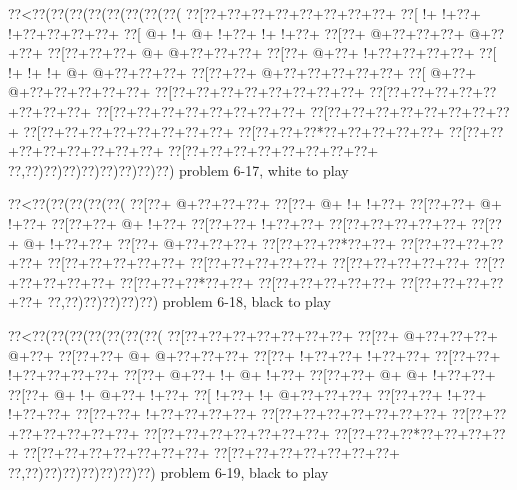 \vbox{\vbox{\goo
\0??<\0??(\0??(\0??(\0??(\0??(\0??(\0??(\0??(
\0??[\0??+\0??+\0??+\0??+\0??+\0??+\0??+\0??+
\0??[\- !+\- !+\0??+\- !+\0??+\0??+\0??+\0??+
\0??[\- @+\- !+\- @+\- !+\0??+\- !+\- !+\0??+
\0??[\0??+\- @+\0??+\0??+\0??+\- @+\0??+\0??+
\0??[\0??+\0??+\0??+\- @+\- @+\0??+\0??+\0??+
\0??[\0??+\- @+\0??+\- !+\0??+\0??+\0??+\0??+
\0??[\- !+\- !+\- !+\- @+\- @+\0??+\0??+\0??+
\0??[\0??+\0??+\- @+\0??+\0??+\0??+\0??+\0??+
\0??[\- @+\0??+\- @+\0??+\0??+\0??+\0??+\0??+
\0??[\0??+\0??+\0??+\0??+\0??+\0??+\0??+\0??+
\0??[\0??+\0??+\0??+\0??+\0??+\0??+\0??+\0??+
\0??[\0??+\0??+\0??+\0??+\0??+\0??+\0??+\0??+
\0??[\0??+\0??+\0??+\0??+\0??+\0??+\0??+\0??+
\0??[\0??+\0??+\0??+\0??+\0??+\0??+\0??+\0??+
\0??[\0??+\0??+\0??*\0??+\0??+\0??+\0??+\0??+
\0??[\0??+\0??+\0??+\0??+\0??+\0??+\0??+\0??+
\0??[\0??+\0??+\0??+\0??+\0??+\0??+\0??+\0??+
\0??,\0??)\0??)\0??)\0??)\0??)\0??)\0??)\0??)
}
\hfil problem 6-17, white to play\hfil\break
}

\vbox{\vbox{\goo
\0??<\0??(\0??(\0??(\0??(\0??(
\0??[\0??+\- @+\0??+\0??+\0??+
\0??[\0??+\- @+\- !+\- !+\0??+
\0??[\0??+\0??+\- @+\- !+\0??+
\0??[\0??+\0??+\- @+\- !+\0??+
\0??[\0??+\0??+\- !+\0??+\0??+
\0??[\0??+\0??+\0??+\0??+\0??+
\0??[\0??+\- @+\- !+\0??+\0??+
\0??[\0??+\- @+\0??+\0??+\0??+
\0??[\0??+\0??+\0??*\0??+\0??+
\0??[\0??+\0??+\0??+\0??+\0??+
\0??[\0??+\0??+\0??+\0??+\0??+
\0??[\0??+\0??+\0??+\0??+\0??+
\0??[\0??+\0??+\0??+\0??+\0??+
\0??[\0??+\0??+\0??+\0??+\0??+
\0??[\0??+\0??+\0??*\0??+\0??+
\0??[\0??+\0??+\0??+\0??+\0??+
\0??[\0??+\0??+\0??+\0??+\0??+
\0??,\0??)\0??)\0??)\0??)\0??)
}
\hfil problem 6-18, black to play\hfil\break
}

\vbox{\vbox{\goo
\0??<\0??(\0??(\0??(\0??(\0??(\0??(\0??(
\0??[\0??+\0??+\0??+\0??+\0??+\0??+\0??+
\0??[\0??+\- @+\0??+\0??+\0??+\- @+\0??+
\0??[\0??+\0??+\- @+\- @+\0??+\0??+\0??+
\0??[\0??+\- !+\0??+\0??+\- !+\0??+\0??+
\0??[\0??+\0??+\- !+\0??+\0??+\0??+\0??+
\0??[\0??+\- @+\0??+\- !+\- @+\- !+\0??+
\0??[\0??+\0??+\- @+\- @+\- !+\0??+\0??+
\0??[\0??+\- @+\- !+\- @+\0??+\- !+\0??+
\0??[\- !+\0??+\- !+\- @+\0??+\0??+\0??+
\0??[\0??+\0??+\- !+\0??+\- !+\0??+\0??+
\0??[\0??+\0??+\- !+\0??+\0??+\0??+\0??+
\0??[\0??+\0??+\0??+\0??+\0??+\0??+\0??+
\0??[\0??+\0??+\0??+\0??+\0??+\0??+\0??+
\0??[\0??+\0??+\0??+\0??+\0??+\0??+\0??+
\0??[\0??+\0??+\0??*\0??+\0??+\0??+\0??+
\0??[\0??+\0??+\0??+\0??+\0??+\0??+\0??+
\0??[\0??+\0??+\0??+\0??+\0??+\0??+\0??+
\0??,\0??)\0??)\0??)\0??)\0??)\0??)\0??)
}
\hfil problem 6-19, black to play\hfil\break
}

